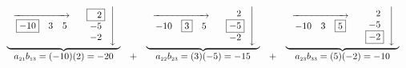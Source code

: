 \[ \begin{array}{ccccc}

\underbrace{\begin{array}{rl} \stackrel{\xrightarrow{\hspace{.75in}}}{\begin{array}{ccc} \fbox{$-10$} &  3 & 5 \end{array}} & \left. \begin{array}{c} \fbox{\hphantom{$-$}2}  \\ -5   \\ -2  \\ \end{array} \right\downarrow \\ \end{array}}

&

&

\underbrace{\begin{array}{rl} \stackrel{\xrightarrow{\hspace{.75in}}}{\begin{array}{ccc} -10 & \fbox{3} & 5 \end{array}} &  \left.  \begin{array}{c} \hphantom{-}2 \\ \fbox{$-5$}    \\ -2  \\ \end{array} \right\downarrow \\\end{array}}

& 


&


\underbrace{\begin{array}{rl} \stackrel{\xrightarrow{\hspace{.75in}}}{\begin{array}{ccc} -10 & 3 & \fbox{$5$} \end{array}} &  \left. \begin{array}{c} \hphantom{-}2 \\ -5 \\ \fbox{$-2$}   \\ \end{array} \right\downarrow \\ \end{array}}   \\

a_{\mbox{\tiny$21$}}b_{\mbox{\tiny$13$}}= (-10)(2) = -20 & + & a_{\mbox{\tiny$22$}}b_{\mbox{\tiny$23$}} = (3)(-5)  = -15 & + & a_{\mbox{\tiny$23$}}b_{\mbox{\tiny$33$}} = (5)(-2)  = -10 \\

\end{array}\]

